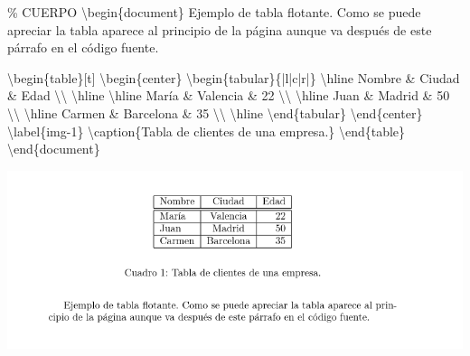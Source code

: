 \documentclass[
  letterpaper,
  DIV=11,
  numbers=noendperiod]{scrreport}
\newenvironment{Shaded}{\begin{snugshade}}{\end{snugshade}}
\newcommand{\CommentTok}[1]{\textcolor[rgb]{0.37,0.37,0.37}{#1}}
\newcommand{\ExtensionTok}[1]{\textcolor[rgb]{0.00,0.23,0.31}{#1}}
\newcommand{\FunctionTok}[1]{\textcolor[rgb]{0.28,0.35,0.67}{#1}}
\newcommand{\KeywordTok}[1]{\textcolor[rgb]{0.00,0.23,0.31}{#1}}
\newcommand{\NormalTok}[1]{\textcolor[rgb]{0.00,0.23,0.31}{#1}}
\newcommand{\OperatorTok}[1]{\textcolor[rgb]{0.37,0.37,0.37}{#1}}
\begin{document}
\begin{Shaded}
\begin{Highlighting}[]
\CommentTok{\% CUERPO}
\KeywordTok{\textbackslash{}begin}\NormalTok{\{}\ExtensionTok{document}\NormalTok{\}}
\NormalTok{Ejemplo de tabla flotante. Como se puede apreciar la tabla aparece al principio de la página aunque va después de este párrafo en el código fuente.}

\KeywordTok{\textbackslash{}begin}\NormalTok{\{}\ExtensionTok{table}\NormalTok{\}[t]}
\KeywordTok{\textbackslash{}begin}\NormalTok{\{}\ExtensionTok{center}\NormalTok{\}}
\KeywordTok{\textbackslash{}begin}\NormalTok{\{}\ExtensionTok{tabular}\NormalTok{\}\{|l|c|r|\}}
\FunctionTok{\textbackslash{}hline}
\NormalTok{Nombre }\OperatorTok{\&}\NormalTok{ Ciudad }\OperatorTok{\&}\NormalTok{ Edad }\FunctionTok{\textbackslash{}\textbackslash{}} 
\FunctionTok{\textbackslash{}hline}
\FunctionTok{\textbackslash{}hline}
\NormalTok{María }\OperatorTok{\&}\NormalTok{ Valencia }\OperatorTok{\&}\NormalTok{ 22 }\FunctionTok{\textbackslash{}\textbackslash{}}
\FunctionTok{\textbackslash{}hline}
\NormalTok{Juan }\OperatorTok{\&}\NormalTok{ Madrid }\OperatorTok{\&}\NormalTok{ 50 }\FunctionTok{\textbackslash{}\textbackslash{}}
\FunctionTok{\textbackslash{}hline}
\NormalTok{Carmen }\OperatorTok{\&}\NormalTok{ Barcelona }\OperatorTok{\&}\NormalTok{ 35 }\FunctionTok{\textbackslash{}\textbackslash{}}
\FunctionTok{\textbackslash{}hline}
\KeywordTok{\textbackslash{}end}\NormalTok{\{}\ExtensionTok{tabular}\NormalTok{\}}
\KeywordTok{\textbackslash{}end}\NormalTok{\{}\ExtensionTok{center}\NormalTok{\}}
\KeywordTok{\textbackslash{}label}\NormalTok{\{}\ExtensionTok{img{-}1}\NormalTok{\}}
\FunctionTok{\textbackslash{}caption}\NormalTok{\{Tabla de clientes de una empresa.\}}
\KeywordTok{\textbackslash{}end}\NormalTok{\{}\ExtensionTok{table}\NormalTok{\}}
\KeywordTok{\textbackslash{}end}\NormalTok{\{}\ExtensionTok{document}\NormalTok{\}}
\end{Highlighting}
\end{Shaded}

\begin{tcolorbox}[enhanced jigsaw, opacitybacktitle=0.6, coltitle=black, colbacktitle=quarto-callout-note-color!10!white, title={Salida}, colback=white, toprule=.15mm, breakable, opacityback=0, left=2mm, rightrule=.15mm, toptitle=1mm, colframe=quarto-callout-note-color-frame, bottomtitle=1mm, titlerule=0mm, arc=.35mm, bottomrule=.15mm, leftrule=.75mm]
\includegraphics{./img/entornos-flotantes/tabla-flotante.png}
\end{tcolorbox}
\end{document}
